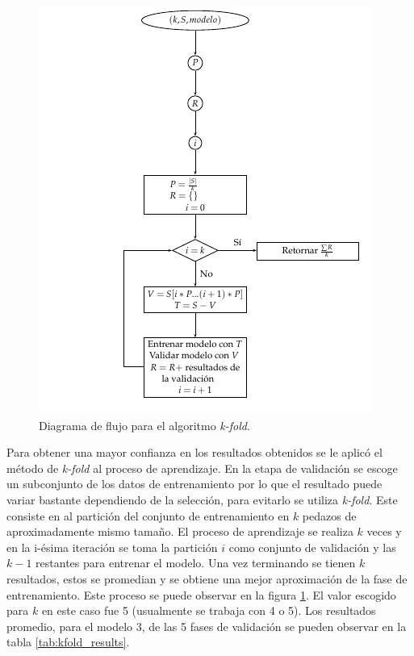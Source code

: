 \begin{figure}[h!t]
    \includegraphics[width=\linewidth]{Images/k_fold.png}
    \caption{Diagrama de flujo para el algoritmo \textit{k-fold}.}
    \label{fig:k_fold}
\end{figure}

Para obtener una mayor confianza en los resultados obtenidos se le aplicó el método de \textit{k-fold} al proceso de aprendizaje. En la etapa de validación se escoge un subconjunto de los datos de entrenamiento por lo que el resultado puede variar bastante dependiendo de la selección, para evitarlo se utiliza \textit{k-fold}. Este consiste en al partición del conjunto de entrenamiento en $k$ pedazos de aproximadamente mismo tamaño. El proceso de aprendizaje se realiza $k$ veces y en la i-\'esima iteración se toma la partición $i$ como conjunto de validación y las $k - 1$ restantes para entrenar el modelo. Una vez terminando se tienen $k$ resultados, estos se promedian y se obtiene una mejor aproximación de la fase de entrenamiento. Este proceso se puede observar en la figura \ref{fig:k_fold}. El valor escogido para $k$ en este caso fue 5 (usualmente se trabaja con 4 o 5). Los resultados promedio, para el modelo 3, de las 5 fases de validación se pueden observar en la tabla \ref{tab:kfold_results}.

